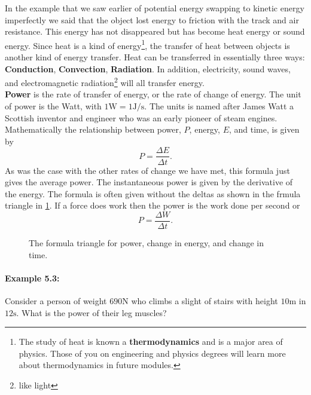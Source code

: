 \documentclass[a4paper,12pt]{book}
\begin{document}
In the example that we saw earlier of potential energy swapping to kinetic energy imperfectly we said that the object lost energy to friction with the track and air resistance. This energy has not disappeared but has become heat energy or sound energy.  Since heat is a kind of energy\footnote{The study of heat is known a \textbf{thermodynamics} and is a major area of physics. Those of you on engineering and physics degrees will learn more about thermodynamics in future modules.}, the transfer of heat between objects is another kind of energy transfer. Heat can be transferred in essentially three ways: \textbf{Conduction}, \textbf{Convection}, \textbf{Radiation}. In addition, electricity, sound waves, and electromagnetic radiation\footnote{like light} will all transfer energy.\\

\textbf{Power} is the rate of transfer of energy, or the rate of change of energy. The unit of power is the Watt, with $1\text{W}=1 \text{J}/\text{s}$. The units is named after James Watt a Scottish inventor and engineer who was an early pioneer of steam engines. Mathematically the relationship between power, $P$, energy, $E$, and time, is given by
\begin{equation}
P=\frac{\Delta E}{\Delta t}.
\label{eq: PET equation}
\end{equation}
As was the case with the other rates of change we have met, this formula just gives the average power. The instantaneous power is given by the derivative of the energy. The formula is often given without the deltas as shown in the frmula triangle in \cref{fig: PEt triangle}. If a force does work then the power is the work done per second or 
\begin{equation*}
P=\frac{\Delta W}{\Delta t}.
\end{equation*}

\begin{figure}[ht]
    \centering
    \large {}
    \caption{The formula triangle for power, change in energy, and change in time. }
    \label{fig: PEt triangle}
\end{figure}

\paragraph{Example 5.3:} Consider a person of weight $690\text{N}$ who climbs a slight of stairs with height $10\text{m}$ in $12\text{s}$.  What is the power of their leg muscles?\\
\end{document}
